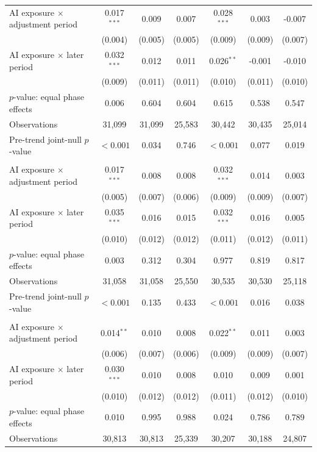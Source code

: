 \begin{table}[!t]
\begin{threeparttable}
\begin{tabular}{@{}lcccccc@{}}
AI exposure $\times$ adjustment period & 0.017$^{***}$ & 0.009 & 0.007 & 0.028$^{***}$ & 0.003 & -0.007 \\
 & (0.004) & (0.005) & (0.005) & (0.009) & (0.009) & (0.007) \\
AI exposure $\times$ later period & 0.032$^{***}$ & 0.012 & 0.011 & 0.026$^{**}$ & -0.001 & -0.010 \\
 & (0.009) & (0.011) & (0.011) & (0.010) & (0.011) & (0.010) \\
$p$-value: equal phase effects & 0.006 & 0.604 & 0.604 & 0.615 & 0.538 & 0.547 \\
Observations & 31,099 & 31,099 & 25,583 & 30,442 & 30,435 & 25,014 \\
Pre-trend joint-null $p$-value & $<0.001$ & 0.034 & 0.746 & $<0.001$ & 0.077 & 0.019 \\
\addlinespace[1pt]
\multicolumn{7}{l}{\textbf{Panel D. Gender: men}} \\
AI exposure $\times$ adjustment period & 0.017$^{***}$ & 0.008 & 0.008 & 0.032$^{***}$ & 0.014 & 0.003 \\
 & (0.005) & (0.007) & (0.006) & (0.009) & (0.009) & (0.007) \\
AI exposure $\times$ later period & 0.035$^{***}$ & 0.016 & 0.015 & 0.032$^{***}$ & 0.016 & 0.005 \\
 & (0.010) & (0.012) & (0.012) & (0.011) & (0.012) & (0.011) \\
$p$-value: equal phase effects & 0.003 & 0.312 & 0.304 & 0.977 & 0.819 & 0.817 \\
Observations & 31,058 & 31,058 & 25,550 & 30,535 & 30,530 & 25,118 \\
Pre-trend joint-null $p$-value & $<0.001$ & 0.135 & 0.433 & $<0.001$ & 0.016 & 0.038 \\
\addlinespace[1pt]
\multicolumn{7}{l}{\textbf{Panel E. Gender: women}} \\
AI exposure $\times$ adjustment period & 0.014$^{**}$ & 0.010 & 0.008 & 0.022$^{**}$ & 0.011 & 0.003 \\
 & (0.006) & (0.007) & (0.006) & (0.009) & (0.009) & (0.007) \\
AI exposure $\times$ later period & 0.030$^{***}$ & 0.010 & 0.008 & 0.010 & 0.009 & 0.001 \\
 & (0.010) & (0.012) & (0.012) & (0.011) & (0.012) & (0.010) \\
$p$-value: equal phase effects & 0.010 & 0.995 & 0.988 & 0.024 & 0.786 & 0.789 \\
Observations & 30,813 & 30,813 & 25,339 & 30,207 & 30,188 & 24,807 \\

\end{tabular}
\end{threeparttable}
\end{table}
